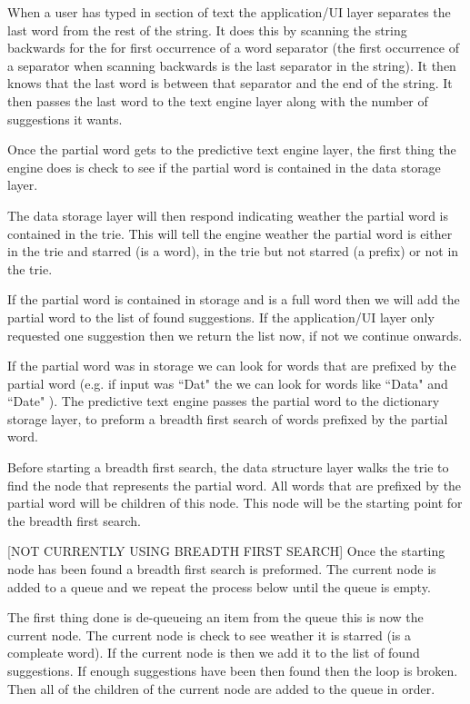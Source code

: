 \documentclass[10pt]{article} %
\begin{document}
            When a user has typed in section of text the application/UI layer separates the last word from the rest of the string. It does this by scanning the string backwards for the for first occurrence of a word separator (the first occurrence of a separator when scanning backwards is the last separator in the string). It then knows that the last word is between that separator and the end of the string. It then passes the last word to the text engine layer along with the number of suggestions it wants.
            
            Once the partial word gets to the predictive text engine layer, the first thing the engine does is check to see if the partial word is contained in the data storage layer. 
            
            The data storage layer will then respond indicating weather the partial word is contained in the trie. This will tell the engine weather the partial word is either in the trie and starred (is a word), in the trie but not starred (a prefix) or not in the trie.
            
            If the partial word is contained in storage and is a full word then we will add the partial word to the list of found suggestions. If the application/UI layer only requested one suggestion then we return the list now, if not we continue onwards.
            
            If the partial word was in storage we can look for words that are prefixed by the partial word (e.g. if input was ``Dat" the we can look for words like ``Data" and ``Date" ). The predictive text engine passes the partial word to the dictionary storage layer, to preform a breadth first search of words prefixed by the partial word.
            
            Before starting a breadth first search, the data structure layer walks the trie to find the node that represents the partial word. All words that are prefixed by the partial word will be children of this node. This node will be the starting point for the breadth first search.
            
            [NOT CURRENTLY USING BREADTH FIRST SEARCH] Once the starting node has been found a breadth first search is preformed. The current node is added to a queue and we repeat the process below until the queue is empty.
            
            The first thing done is de-queueing an item from the queue this is now the current node.
            The current node is check to see weather it is starred (is a compleate word). If the current node is then we add it to the list of found suggestions. If enough suggestions have been then found then the loop is broken.
            Then all of the children of the current node are added to the queue in order.
            
\end{document}
